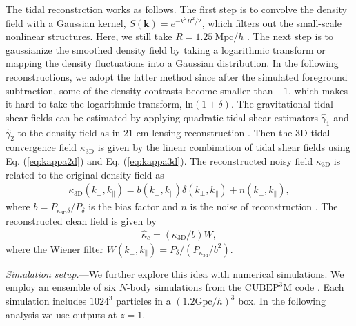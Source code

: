\documentclass[aps,prl,twocolumn,showpacs,superscriptaddress,groupedaddress,nofootinbib,floatfix]{revtex4}  %
\newcommand{\mr}{\mathrm}
\begin{document}
The tidal reconstrction works as follows. The first step is to convolve
the density field with a Gaussian kernel, $S(\bm{k})=e^{-k^2R^2/2}$, which
filters out the small-scale nonlinear structures.
Here, we still take $R=1.25\ \mr{Mpc}/h$ \cite{2012:pen,2015:zhu}. The
next step is to gaussianize the smoothed density field by taking a logarithmic
transform or mapping the density fluctuations into a Gaussian distribution. 
In the following reconstructions, we adopt the latter method since after the
simulated
foreground subtraction, some of the density contrasts become smaller than $-1$,
which makes it hard to take the logarithmic transform, $\mathrm{ln}(1+\delta)$.
The gravitational tidal shear fields can be estimated by applying quadratic 
tidal shear estimators $\hat{\gamma}_1$ and $\hat{\gamma}_2$ to the density 
field as in 21 cm lensing reconstruction \cite{2008:lu}. 
Then the 3D tidal convergence field $\kappa_\mr{3D}$ is given by the linear 
combination of tidal shear fields using Eq. (\ref{eq:kappa2d}) and 
Eq. (\ref{eq:kappa3d}).
The reconstructed noisy field $\kappa_\mr{3D}$ is related to the original 
density field as 
\begin{eqnarray}
\kappa_\mr{3D}(k_\perp,k_\parallel)=b(k_\perp,k_\parallel)
\delta(k_\perp,k_\parallel)+n(k_\perp,k_\parallel),
\end{eqnarray}
where $b=P_{\kappa_\mr{3D}\delta}/P_{\delta}$ is the bias factor and $n$ is 
the noise of reconstruction \cite{2015:zhu}. 
The reconstructed clean field is given by 
\begin{eqnarray}
\label{eq:kapc}
\hat{\kappa}_c=({\kappa_\mr{3D}}/{b})W,
\end{eqnarray}
where the Wiener filter $W(k_\perp,k_\parallel)=
P_\delta/(P_{\kappa_\mr{3d}}/b^2)$.

{\it Simulation setup.}---We further explore this idea with numerical 
simulations. We employ an ensemble of six $N$-body simulations from the
$\mr{CUBEP}^3\mr{M}$ code \cite{2013:code}. 
Each simulation includes $1024^3$ particles in a $(1.2\mr{Gpc}/h)^3$ box. 
In the following analysis we use outputs at $z=1$.
\end{document}
